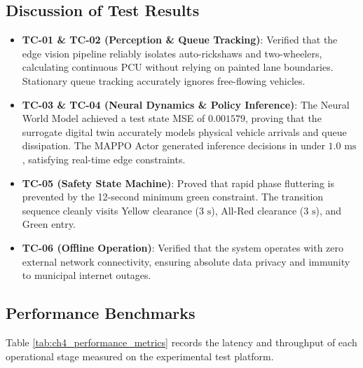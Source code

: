 \documentclass[12pt,a4paper,oneside]{report}
\begin{document}
\subsection{Discussion of Test Results}
\begin{itemize}
    \item \textbf{TC-01 \& TC-02 (Perception \& Queue Tracking)}: Verified that the edge vision pipeline reliably isolates auto-rickshaws and two-wheelers, calculating continuous PCU without relying on painted lane boundaries. Stationary queue tracking accurately ignores free-flowing vehicles.
    \item \textbf{TC-03 \& TC-04 (Neural Dynamics \& Policy Inference)}: The Neural World Model achieved a test state MSE of $0.001579$, proving that the surrogate digital twin accurately models physical vehicle arrivals and queue dissipation. The MAPPO Actor generated inference decisions in under $1.0\text{ ms}$, satisfying real-time edge constraints.
    \item \textbf{TC-05 (Safety State Machine)}: Proved that rapid phase fluttering is prevented by the 12-second minimum green constraint. The transition sequence cleanly visits Yellow clearance ($3\text{ s}$), All-Red clearance ($3\text{ s}$), and Green entry.
    \item \textbf{TC-06 (Offline Operation)}: Verified that the system operates with zero external network connectivity, ensuring absolute data privacy and immunity to municipal internet outages.
\end{itemize}

\subsection{Performance Benchmarks}
Table \ref{tab:ch4_performance_metrics} records the latency and throughput of each operational stage measured on the experimental test platform.
\end{document}
